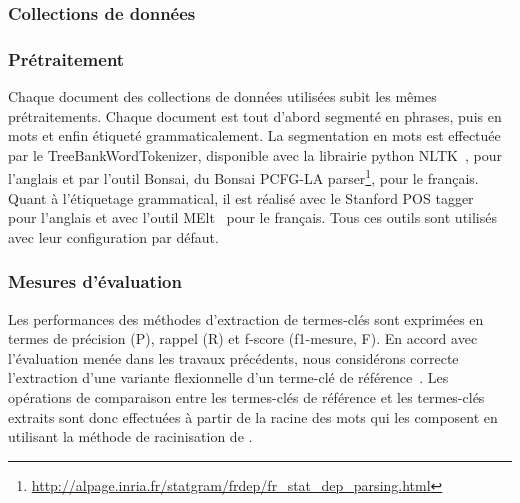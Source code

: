       \subsubsection{Collections de données}
      \label{subsubsec:main-automatic_keyphrase_annotation-unsupervised_automatic_keyphrase_extraction-evaluation-evaluation_data}


      \subsubsection{Prétraitement}
      \label{subsubsec:main-automatic_keyphrase_annotation-unsupervised_automatic_keyphrase_extraction-evaluation-preprocessing}
        Chaque document des collections de données utilisées subit les mêmes
        prétraitements. Chaque document est tout d'abord segmenté en phrases,
        puis en mots et enfin étiqueté grammaticalement. La segmentation en mots
        est effectuée par le TreeBankWordTokenizer, disponible avec la librairie
        python NLTK~\cite[\textit{Natural Language ToolKit}]{bird2009nltk}, pour
        l'anglais et par l'outil Bonsai, du Bonsai PCFG-LA
        parser\footnote{\url{http://alpage.inria.fr/statgram/frdep/fr_stat_dep_parsing.html}},
        pour le français. Quant à l'étiquetage grammatical, il est réalisé avec
        le Stanford POS tagger~\cite{toutanova2003stanfordpostagger} pour
        l'anglais et avec l'outil MElt~\cite{denis2009melt} pour le français.
        Tous ces outils sont utilisés avec leur configuration par défaut.

      \subsubsection{Mesures d'évaluation}
      \label{subsubsec:main-automatic_keyphrase_annotation-unsupervised_automatic_keyphrase_extraction-evaluation-evaluation_measures}
        Les performances des méthodes d'extraction de termes-clés sont exprimées
        en termes de précision (P), rappel (R) et f-score (f1-mesure, F). En
        accord avec l'évaluation menée dans les travaux précédents, nous
        considérons correcte l'extraction d'une variante flexionnelle d'un
        terme-clé de référence~\cite{kim2010semeval}. Les opérations de
        comparaison entre les termes-clés de référence et les termes-clés
        extraits sont donc effectuées à partir de la racine des mots qui les
        composent en utilisant la méthode de racinisation de
        .

